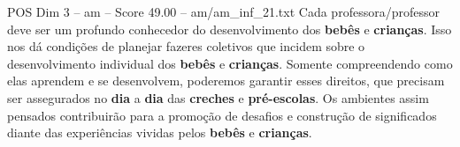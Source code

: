 \begin{textsample}{POS Dim 3 – am – Score 49.00 – am/am\_inf\_21.txt}
Cada professora/professor deve ser um profundo conhecedor do desenvolvimento dos \textbf{bebês} e \textbf{crianças}.
Isso nos dá condições de planejar fazeres coletivos que incidem sobre o desenvolvimento individual dos \textbf{bebês} e \textbf{crianças}.
Somente compreendendo como elas aprendem e se desenvolvem, poderemos garantir esses direitos, que precisam ser assegurados no \textbf{dia} a \textbf{dia} das \textbf{creches} e \textbf{pré-escolas}.
Os ambientes assim pensados contribuirão para a promoção de desafios e construção de significados diante das experiências vividas pelos \textbf{bebês} e \textbf{crianças}.

\end{textsample}
